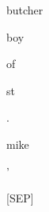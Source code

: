\documentclass[varwidth=150mm]{standalone}
\begin{document}
\begin{CJK*}{UTF8}{gbsn}
{{{\colorbox{red!3.9068660736083984}{\strut butcher} \colorbox{red!0.0}{\strut boy} \colorbox{red!9.410377502441406}{\strut of} \colorbox{red!29.286073684692383}{\strut st} \colorbox{red!4.908071994781494}{\strut .} \colorbox{red!13.764715194702148}{\strut mike} \colorbox{red!17.410120010375977}{\strut '} \colorbox{red!1.0262056589126587}{\strut [SEP]}
}}}
\end{CJK*}
\end{document}
